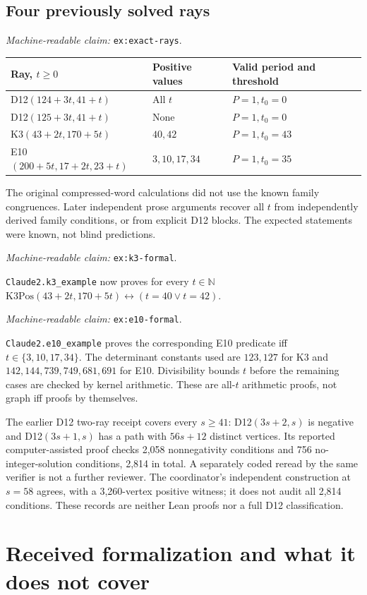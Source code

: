 \documentclass[11pt]{amsart}
\newcommand{\N}{\mathbb N}
\newcommand{\record}[1]{\nolinkurl{#1}}
\newcommand{\claimid}[1]{\par\nopagebreak\noindent\textit{Machine-readable claim:} \record{#1}.\par}
\theoremstyle{definition}\newtheorem{definition}{Definition}
\begin{document}
\subsection{Four previously solved rays}\label{ex:exact-rays}
\claimid{ex:exact-rays}
\begin{center}
\begin{tabular}{lll}\toprule
Ray, $t\ge0$ & Positive values & Valid period and threshold\\\midrule
D12$(124+3t,41+t)$ & All $t$ & $P=1,t_0=0$\\
D12$(125+3t,41+t)$ & None & $P=1,t_0=0$\\
K3$(43+2t,170+5t)$ & $40,42$ & $P=1,t_0=43$\\
E10$(200+5t,17+2t,23+t)$ & $3,10,17,34$ & $P=1,t_0=35$\\\bottomrule
\end{tabular}
\end{center}
The original compressed-word calculations did not use the known
family congruences. Later independent prose arguments recover all
$t$ from independently derived family conditions, or from explicit
D12 blocks. The expected statements were known, not blind predictions.
\label{ex:k3-formal}\claimid{ex:k3-formal}
\record{Claude2.k3_example} now proves for every $t\in\N$
$\mathrm{K3Pos}(43+2t,170+5t)\leftrightarrow(t=40\lor t=42)$.
\label{ex:e10-formal}\claimid{ex:e10-formal}
\record{Claude2.e10_example} proves the corresponding E10 predicate
iff $t\in\{3,10,17,34\}$. The determinant constants used are
$123,127$ for K3 and $142,144,739,749,681,691$ for E10. Divisibility
bounds $t$ before the remaining cases are checked by kernel arithmetic.
These are all-$t$ arithmetic proofs, not graph iff proofs by themselves.

The earlier D12 two-ray receipt covers every $s\ge41$:
D12$(3s+2,s)$ is negative and D12$(3s+1,s)$ has a path with
$56s+12$ distinct vertices. Its reported computer-assisted proof checks
2,058 nonnegativity conditions and 756 no-integer-solution conditions,
2,814 in total. A separately coded reread by the same verifier is not
a further reviewer. The coordinator's independent construction at
$s=58$ agrees, with a 3,260-vertex positive witness; it does not audit
all 2,814 conditions. These records are neither Lean proofs nor a
full D12 classification.

\section{Received formalization and what it does not cover}\label{sec:formal}
\end{document}
